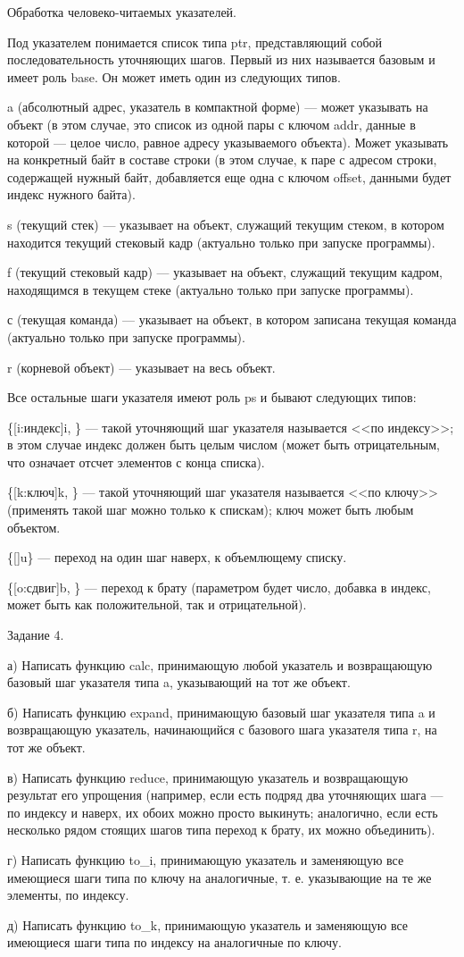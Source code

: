 \documentclass{report}
\begin{document}
    Обработка человеко-читаемых указателей.

    Под указателем понимается список типа ptr, представляющий собой последовательность уточняющих шагов. Первый из них называется базовым и имеет роль base. Он может иметь один из следующих типов.

    a (абсолютный адрес, указатель в компактной форме) --- может указывать на объект (в этом случае, это список из одной пары с ключом addr, данные в которой --- целое число, равное адресу указываемого объекта). Может указывать на конкретный байт в составе строки (в этом случае, к паре с адресом строки, содержащей нужный байт, добавляется еще одна с ключом offset, данными будет индекс нужного байта).

    s (текущий стек) --- указывает на объект, служащий текущим стеком, в котором находится текущий стековый кадр (актуально только при запуске программы).

    f (текущий стековый кадр) --- указывает на объект, служащий текущим кадром, находящимся в текущем стеке (актуально только при запуске программы).

    с (текущая команда) --- указывает на объект, в котором записана текущая команда (актуально только при запуске программы).

    r (корневой объект) --- указывает на весь объект.

   Все остальные шаги указателя имеют роль ps и бывают следующих типов:

    \{[i:индекс]i, \} --- такой уточняющий шаг указателя называется <<по индексу>>; в этом случае индекс должен быть целым числом (может быть отрицательным, что означает отсчет элементов с конца списка).

    \{[k:ключ]k, \} --- такой уточняющий шаг указателя называется <<по ключу>> (применять такой шаг можно только к спискам); ключ может быть любым объектом.

    \{[]u\} --- переход на один шаг наверх, к объемлющему списку.

    \{[o:сдвиг]b, \} --- переход к брату (параметром будет число, добавка в индекс, может быть как положительной, так и отрицательной).

    Задание 4.

    а) Написать функцию calc, принимающую любой указатель и возвращающую базовый шаг указателя типа a, указывающий на тот же объект.

    б) Написать функцию expand, принимающую базовый шаг указателя типа a и возвращающую указатель, начинающийся с базового шага указателя типа r, на тот же объект.

    в) Написать функцию reduce, принимающую указатель и возвращающую результат его упрощения (например, если есть подряд два уточняющих шага --- по индексу и наверх, их обоих можно просто выкинуть; аналогично, если есть несколько рядом стоящих шагов типа переход к брату, их можно объединить).

    г) Написать функцию to\_i, принимающую указатель и заменяющую все имеющиеся шаги типа по ключу на аналогичные, т. е. указывающие на те же элементы, по индексу.

    д) Написать функцию to\_k, принимающую указатель и заменяющую все имеющиеся шаги типа по индексу на аналогичные по ключу.
\end{document}
